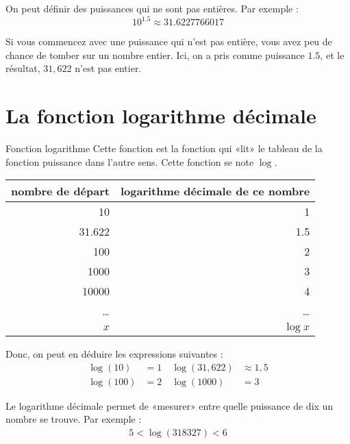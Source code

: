 \documentclass[11pt]{article}
\begin{document}
\begin{rem}
On peut définir des puissances qui ne sont pas entières. Par exemple :
\[
10^{1.5} \approx 31.6227766017
\]
\end{rem}

\begin{rem}
Si vous commencez avec une puissance qui n'est pas entière, vous avez peu de
chance de tomber sur un nombre entier. Ici, on a pris comme puissance $1.5$, et
le résultat, $31,622$ n'est pas entier.
\end{rem}

\section{La fonction logarithme décimale}
\label{sec:org3064e8b}

\begin{defi}{Fonction logarithme}
Cette fonction est la fonction qui «lit» le tableau de la fonction puissance
dans l'autre sens. Cette fonction se note $\log$.
\end{defi}

\begin{center}
\begin{tabular}{rr}
nombre de départ & logarithme décimale de ce nombre\\
\hline
10 & 1\\
31.622 & 1.5\\
100 & 2\\
1000 & 3\\
10000 & 4\\
\ldots{} & \ldots{}\\
\(x\) & \(\log{x}\)\\
\end{tabular}
\end{center}

Donc, on peut en déduire les expressions suivantes :
\begin{align*}
  \log(10)  & = 1 \quad \log(31,622) & \approx 1,5 \\
  \log(100) & = 2 \quad \log(1000)   & = 3
\end{align*}

Le logarithme décimale permet de «mesurer» entre quelle puissance de dix un nombre se trouve. Par exemple :
\begin{align*}
    5 < \log(318327) < 6
\end{align*}
\end{document}
